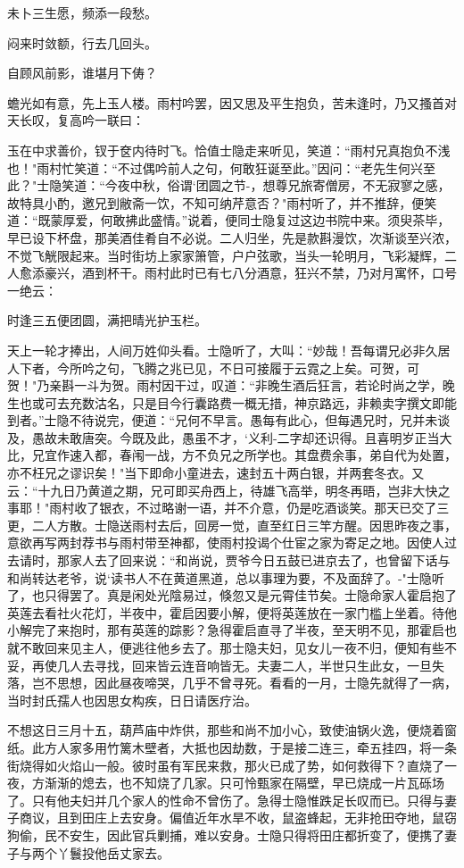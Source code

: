 未卜三生愿，频添一段愁。

闷来时敛额，行去几回头。

自顾风前影，谁堪月下俦？

蟾光如有意，先上玉人楼。雨村吟罢，因又思及平生抱负，苦未逢时，乃又搔首对天长叹，复高吟一联曰：

玉在中求善价，钗于奁内待时飞。恰值士隐走来听见，笑道：“雨村兄真抱负不浅也！"雨村忙笑道：“不过偶吟前人之句，何敢狂诞至此。”因问：“老先生何兴至此？"士隐笑道：“今夜中秋，俗谓`团圆之节-，想尊兄旅寄僧房，不无寂寥之感，故特具小酌，邀兄到敝斋一饮，不知可纳芹意否？"雨村听了，并不推辞，便笑道：“既蒙厚爱，何敢拂此盛情。”说着，便同士隐复过这边书院中来。须臾茶毕，早已设下杯盘，那美酒佳肴自不必说。二人归坐，先是款斟漫饮，次渐谈至兴浓，不觉飞觥限起来。当时街坊上家家箫管，户户弦歌，当头一轮明月，飞彩凝辉，二人愈添豪兴，酒到杯干。雨村此时已有七八分酒意，狂兴不禁，乃对月寓怀，口号一绝云：

时逢三五便团圆，满把晴光护玉栏。

天上一轮才捧出，人间万姓仰头看。士隐听了，大叫：“妙哉！吾每谓兄必非久居人下者，今所吟之句，飞腾之兆已见，不日可接履于云霓之上矣。可贺，可贺！"乃亲斟一斗为贺。雨村因干过，叹道：“非晚生酒后狂言，若论时尚之学，晚生也或可去充数沽名，只是目今行囊路费一概无措，神京路远，非赖卖字撰文即能到者。”士隐不待说完，便道：“兄何不早言。愚每有此心，但每遇兄时，兄并未谈及，愚故未敢唐突。今既及此，愚虽不才，`义利-二字却还识得。且喜明岁正当大比，兄宜作速入都，春闱一战，方不负兄之所学也。其盘费余事，弟自代为处置，亦不枉兄之谬识矣！"当下即命小童进去，速封五十两白银，并两套冬衣。又云：“十九日乃黄道之期，兄可即买舟西上，待雄飞高举，明冬再晤，岂非大快之事耶！"雨村收了银衣，不过略谢一语，并不介意，仍是吃酒谈笑。那天已交了三更，二人方散。士隐送雨村去后，回房一觉，直至红日三竿方醒。因思昨夜之事，意欲再写两封荐书与雨村带至神都，使雨村投谒个仕宦之家为寄足之地。因使人过去请时，那家人去了回来说：“和尚说，贾爷今日五鼓已进京去了，也曾留下话与和尚转达老爷，说`读书人不在黄道黑道，总以事理为要，不及面辞了。-"士隐听了，也只得罢了。真是闲处光陰易过，倏忽又是元霄佳节矣。士隐命家人霍启抱了英莲去看社火花灯，半夜中，霍启因要小解，便将英莲放在一家门槛上坐着。待他小解完了来抱时，那有英莲的踪影？急得霍启直寻了半夜，至天明不见，那霍启也就不敢回来见主人，便逃往他乡去了。那士隐夫妇，见女儿一夜不归，便知有些不妥，再使几人去寻找，回来皆云连音响皆无。夫妻二人，半世只生此女，一旦失落，岂不思想，因此昼夜啼哭，几乎不曾寻死。看看的一月，士隐先就得了一病，当时封氏孺人也因思女构疾，日日请医疗治。

不想这日三月十五，葫芦庙中炸供，那些和尚不加小心，致使油锅火逸，便烧着窗纸。此方人家多用竹篱木壁者，大抵也因劫数，于是接二连三，牵五挂四，将一条街烧得如火焰山一般。彼时虽有军民来救，那火已成了势，如何救得下？直烧了一夜，方渐渐的熄去，也不知烧了几家。只可怜甄家在隔壁，早已烧成一片瓦砾场了。只有他夫妇并几个家人的性命不曾伤了。急得士隐惟跌足长叹而已。只得与妻子商议，且到田庄上去安身。偏值近年水旱不收，鼠盗蜂起，无非抢田夺地，鼠窃狗偷，民不安生，因此官兵剿捕，难以安身。士隐只得将田庄都折变了，便携了妻子与两个丫鬟投他岳丈家去。

